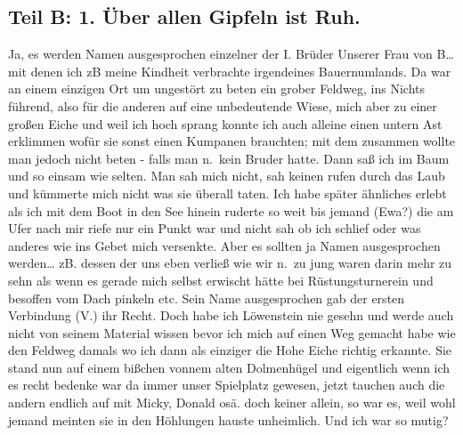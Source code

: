 \documentclass[
]{article}
\author{}
\date{\vspace{-2.5em}}
\begin{document}
\subsection{Teil B: 1. Über allen Gipfeln ist
Ruh.}\label{teil-b-1.-uxfcber-allen-gipfeln-ist-ruh.}

Ja, es werden Namen ausgesprochen einzelner der I. Brüder Unserer Frau
von B\ldots{} mit denen ich zB meine Kindheit verbrachte irgendeines
Bauernumlands. Da war an einem einzigen Ort um ungestört zu beten ein
grober Feldweg, ins Nichts führend, also für die anderen auf eine
unbedeutende Wiese, mich aber zu einer großen Eiche und weil ich hoch
sprang konnte ich auch alleine einen untern Ast erklimmen wofür sie
sonst einen Kumpanen brauchten; mit dem zusammen wollte man jedoch nicht
beten - falls man n.~kein Bruder hatte. Dann saß ich im Baum und so
einsam wie selten. Man sah mich nicht, sah keinen rufen durch das Laub
und kümmerte mich nicht was sie überall taten. Ich habe später ähnliches
erlebt als ich mit dem Boot in den See hinein ruderte so weit bis jemand
(Ewa?) die am Ufer nach mir riefe nur ein Punkt war und nicht sah ob ich
schlief oder was anderes wie ins Gebet mich versenkte. Aber es sollten
ja Namen ausgesprochen werden\ldots{} zB. dessen der uns eben verließ
wie wir n.~zu jung waren darin mehr zu sehn als wenn es gerade mich
selbst erwischt hätte bei Rüstungsturnerein und besoffen vom Dach
pinkeln etc. Sein Name ausgesprochen gab der ersten Verbindung (V.) ihr
Recht. Doch habe ich Löwenstein nie gesehn und werde auch nicht von
seinem Material wissen bevor ich mich auf einen Weg gemacht habe wie den
Feldweg damals wo ich dann als einziger die Hohe Eiche richtig erkannte.
Sie stand nun auf einem bißchen vonnem alten Dolmenhügel und eigentlich
wenn ich es recht bedenke war da immer unser Spielplatz gewesen, jetzt
tauchen auch die andern endlich auf mit Micky, Donald osä. doch keiner
allein, so war es, weil wohl jemand meinten sie in den Höhlungen hauste
unheimlich. Und ich war so mutig?
\end{document}

